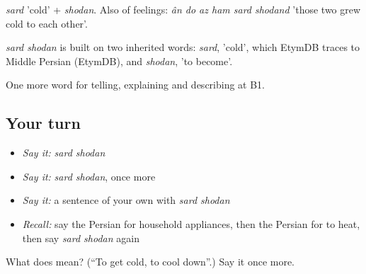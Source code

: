 \emph{sard} 'cold' + \emph{shodan}. Also of feelings: \emph{ân do az ham sard shodand} 'those two grew cold to each other'.

\begin{cousinweb}
\emph{sard shodan} is built on two inherited words: \emph{sard}, 'cold', which EtymDB traces to Middle Persian (EtymDB), and \emph{shodan}, 'to become'.
\end{cousinweb}

\begin{grammarlens}[title={What you've built}]
One more word for telling, explaining and describing at B1.
\end{grammarlens}

\subsection*{Your turn}
\begin{itemize}
\raggedright
  \item \emph{Say it:} \emph{sard shodan}
  \item \emph{Say it:} \emph{sard shodan}, once more
  \item \emph{Say it:} a sentence of your own with \emph{sard shodan}
  \item \emph{Recall:} say the Persian for household appliances, then the Persian for to heat, then say \emph{sard shodan} again
\end{itemize}

\begin{tcolorbox}[breakable,colback=teal!4,colframe=teal!35!black,title={Before you move on}]
What does   mean? (\textquotedblleft{}To get cold, to cool down\textquotedblright{}.) Say it once more.
\end{tcolorbox}
